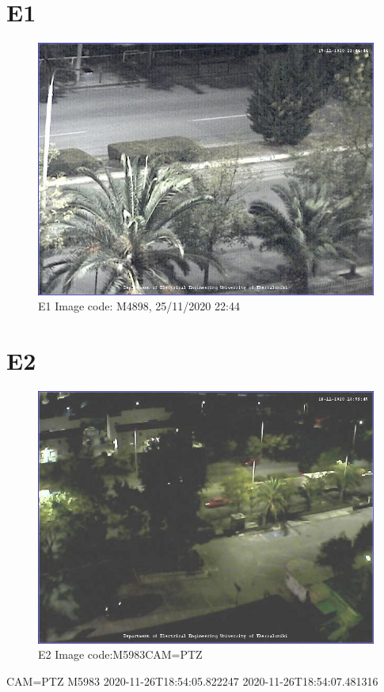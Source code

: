 \documentclass[hidelinks, 12pt, a4paper]{article}
\begin{document}
\section{E1}

\begin{figure}[h!]
\centering
	\includegraphics[height=.38\textheight, width=\textwidth]{assets/session1/image_fix.jpg}
	\caption{E1 Image code: M4898, 25/11/2020 22:44} 
\end{figure}

\section{E2}

\begin{figure}[h!]
\centering
	\includegraphics[height=.38\textheight, width=\textwidth]{assets/session1/image_ptz.jpg}
	\caption{E2 Image code:M5983CAM=PTZ} 
\end{figure}
CAM=PTZ
M5983 
2020-11-26T18:54:05.822247
2020-11-26T18:54:07.481316
\end{document}
